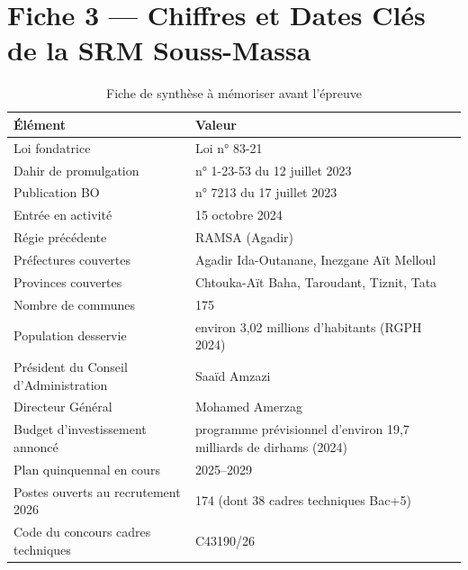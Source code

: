 \section{Fiche 3 --- Chiffres et Dates Clés de la SRM Souss-Massa}
\begin{table}[H]
\centering
\small
\begin{tabular}{|p{5.5cm}|p{8cm}|}
\hline
\rowcolor{gray!20} \textbf{Élément} & \textbf{Valeur} \\ \hline
Loi fondatrice & Loi n° 83-21 \\ \hline
Dahir de promulgation & n° 1-23-53 du 12 juillet 2023 \\ \hline
Publication BO & n° 7213 du 17 juillet 2023 \\ \hline
Entrée en activité & 15 octobre 2024 \\ \hline
Régie précédente & RAMSA (Agadir) \\ \hline
Préfectures couvertes & Agadir Ida-Outanane, Inezgane Aït Melloul \\ \hline
Provinces couvertes & Chtouka-Aït Baha, Taroudant, Tiznit, Tata \\ \hline
Nombre de communes & 175 \\ \hline
Population desservie & environ 3,02 millions d'habitants (RGPH 2024) \\ \hline
Président du Conseil d'Administration & Saaïd Amzazi \\ \hline
Directeur Général & Mohamed Amerzag \\ \hline
Budget d'investissement annoncé & programme prévisionnel d'environ 19,7 milliards de dirhams (2024) \\ \hline
Plan quinquennal en cours & 2025--2029 \\ \hline
Postes ouverts au recrutement 2026 & 174 (dont 38 cadres techniques Bac+5) \\ \hline
Code du concours cadres techniques & C43190/26 \\ \hline
\end{tabular}
\caption{Fiche de synthèse à mémoriser avant l'épreuve}
\end{table}

